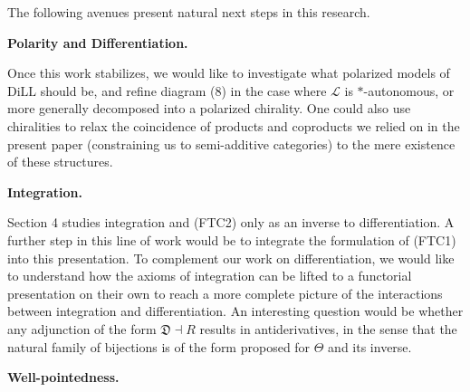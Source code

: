  
 
The following avenues present natural next steps in this research.\par
 
 
 
\par\medskip\noindent\textbf{Polarity and Differentiation.}\par
 
 
Once this work stabilizes, we would like to investigate what polarized models of $\mathrm{DiLL}$ should be, and refine diagram (8) in the case where $\mathscr{L}$ is $\ast$-autonomous, or more generally decomposed into a polarized chirality. One could also use chiralities to relax the coincidence of products and coproducts we relied on in the present paper (constraining us to semi-additive categories) to the mere existence of these structures.\par
 
 
 
 
\par\medskip\noindent\textbf{Integration.}\par
 
 
Section 4 studies integration and (FTC2) only as an inverse to differentiation. A further step in this line of work would be to integrate the formulation of (FTC1) into this presentation. To complement our work on differentiation, we would like to understand how the axioms of integration can be lifted to a functorial presentation on their own to reach a more complete picture of the interactions between integration and differentiation. An interesting question would be whether any adjunction of the form $\mathfrak{D}\dashv R$ results in antiderivatives, in the sense that the natural family of bijections is of the form proposed for $\Theta$ and its inverse.\par
 
 
 
 
\par\medskip\noindent\textbf{Well-pointedness.}\par
 
